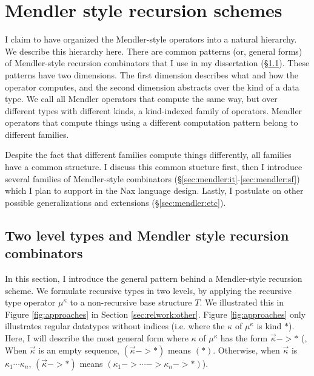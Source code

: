 \section{Mendler style recursion schemes}\label{sec:mendler} I claim to
have organized the Mendler-style operators into a natural hierarchy. We
describe this hierarchy here. There are common patterns (or, general
forms) of Mendler-style recursion combinators that I use in my
dissertation (\S\ref{sec:mendler:intro}). These patterns have two
dimensions. The first dimension describes what and how the operator
computes, and the second dimension abstracts over the kind of a data
type. We call all Mendler operators that compute the same way, but over
different types with different kinds,  a kind-indexed family of
operators. Mendler operators that compute things using a different
computation pattern belong to different families.

Despite the fact that different families compute things differently, all
families have a common structure. I discuss this common stucture first,
then I introduce several families of Mendler-style combinators
(\S\ref{sec:mendler:it}-\ref{sec:mendler:sf}) which I plan to support in
the Nax language design. Lastly, I postulate on other possible
generalizations and extensions (\S\ref{sec:mendler:etc}).

\subsection{Two level types and Mendler style recursion combinators}
\label{sec:mendler:intro}
In this section, I introduce the general pattern behind a Mendler-style recursion scheme.
We formulate recursive types in two levels,  by applying the recursive type operator
$\mu^\kappa$ to a non-recursive base structure $T$. 
We illustrated this in Figure \ref{fig:approaches}
in Section \ref{sec:relwork:other}. Figure \ref{fig:approaches}
only illustrates regular datatypes without indices
(i.e. where the $\kappa$ of $\mu^\kappa$ is kind $*$). Here, I will describe
the most general form where $\kappa$ of $\mu^\kappa$ has the form
$\vec{\kappa} -> *$ (\ie, When $\vec{\kappa}$ is an empty sequence,
$(\vec{\kappa} -> *)$ means $(*)$. Otherwise, when $\vec{\kappa}$ is
$\kappa_1 \cdots \kappa_n$, $(\vec{\kappa} -> *)$ means
$(\kappa_1 -> \cdots -> \kappa_n -> *)$).

